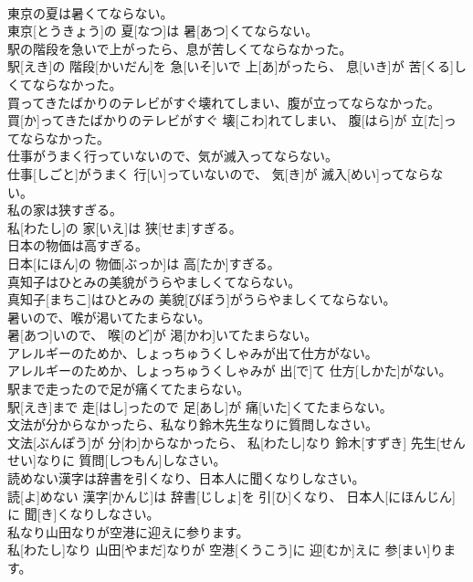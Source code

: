 \documentclass[8pt]{extreport}
\begin{document}
\begin{CJK}{UTF8}{min}
\\	東京の夏は暑くてならない。	
\\	東京[とうきょう]の 夏[なつ]は 暑[あつ]くてならない。
\\	駅の階段を急いで上がったら、息が苦しくてならなかった。	
\\	駅[えき]の 階段[かいだん]を 急[いそ]いで 上[あ]がったら、 息[いき]が 苦[くる]しくてならなかった。
\\	買ってきたばかりのテレビがすぐ壊れてしまい、腹が立ってならなかった。	
\\	買[か]ってきたばかりのテレビがすぐ 壊[こわ]れてしまい、 腹[はら]が 立[た]ってならなかった。
\\	仕事がうまく行っていないので、気が滅入ってならない。	
\\	仕事[しごと]がうまく 行[い]っていないので、 気[き]が 滅入[めい]ってならない。
\\	私の家は狭すぎる。	
\\	私[わたし]の 家[いえ]は 狭[せま]すぎる。
\\	日本の物価は高すぎる。	
\\	日本[にほん]の 物価[ぶっか]は 高[たか]すぎる。
\\	真知子はひとみの美貌がうらやましくてならない。	
\\	真知子[まちこ]はひとみの 美貌[びぼう]がうらやましくてならない。
\\	暑いので、喉が渇いてたまらない。	
\\	暑[あつ]いので、 喉[のど]が 渇[かわ]いてたまらない。
\\	アレルギーのためか、しょっちゅうくしゃみが出て仕方がない。	
\\	アレルギーのためか、しょっちゅうくしゃみが 出[で]て 仕方[しかた]がない。
\\	駅まで走ったので足が痛くてたまらない。	
\\	駅[えき]まで 走[はし]ったので 足[あし]が 痛[いた]くてたまらない。
\\	文法が分からなかったら、私なり鈴木先生なりに質問しなさい。	
\\	文法[ぶんぽう]が 分[わ]からなかったら、 私[わたし]なり 鈴木[すずき] 先生[せんせい]なりに 質問[しつもん]しなさい。
\\	読めない漢字は辞書を引くなり、日本人に聞くなりしなさい。	
\\	読[よ]めない 漢字[かんじ]は 辞書[じしょ]を 引[ひ]くなり、 日本人[にほんじん]に 聞[き]くなりしなさい。
\\	私なり山田なりが空港に迎えに参ります。	
\\	私[わたし]なり 山田[やまだ]なりが 空港[くうこう]に 迎[むか]えに 参[まい]ります。

\end{CJK}
\end{document}

